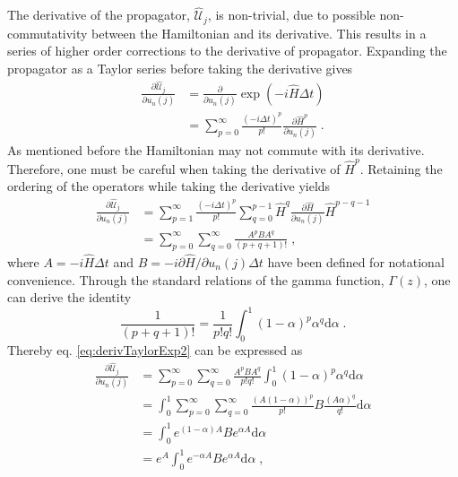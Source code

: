 The derivative of the propagator, $\hat{\mathcal{U}}_{j}$, is non-trivial, due to possible non-commutativity between the Hamiltonian and its derivative. This results in a series of higher order corrections to the derivative of propagator.
Expanding the propagator as a Taylor series before taking the derivative gives
\begin{align}
	\frac{\partial \hat{\mathcal{U}}_{j}}{\partial u_n (j)} &= \frac{\partial}{\partial u_n (j)}  \exp \left( -i \hat{H} \Delta t \right) \nonumber \\
	&= \sum_{p = 0}^{\infty} \frac{( -i \Delta t  )^p}{p!} \frac{\partial \hat{H}^p}{\partial u_n (j)} \; .  
	\label{eq:derivTaylorExp}
\end{align}
As mentioned before the Hamiltonian may not commute with its derivative. Therefore, one must be careful when taking the derivative of $\hat{H}^p$. Retaining the ordering of the operators while taking the derivative yields
\begin{align}
	\frac{\partial \hat{\mathcal{U}}_{j}}{\partial u_n (j)} &= \sum_{p=1}^{\infty} \frac{ \left( -i \Delta t \right) ^p }{p!} \sum_{q=0}^{p-1} \hat{H}^q \frac{\partial \hat{H}}{\partial u_n (j)} \hat{H}^{p-q-1} \nonumber \\
	&= \sum_{p=0}^{\infty} \sum_{q=0}^{\infty} \frac{A^p B A^q}{(p+q+1)!} \; , \label{eq:derivTaylorExp2}
\end{align} 
where $A = -i \hat{H} \Delta t$ and $B = -i \partial \hat{H}/\partial u_n (j) \Delta t$ have been defined for notational convenience. Through the standard relations of the gamma function, $\Gamma (z)$, one can derive the identity
\begin{equation}
	\frac{1}{(p+q+1)!} = \frac{1}{p! q !} \int_{0}^{1} (1-\alpha)^p \alpha^q \mathrm{d}\alpha \; .
\end{equation}
Thereby eq. \eqref{eq:derivTaylorExp2} can be expressed as
\begin{align}
	\frac{\partial \hat{\mathcal{U}}_{j}}{\partial u_n (j)} &= \sum_{p=0}^{\infty} \sum_{q=0}^{\infty} \frac{A^p B A^q}{p! q !}  \int_{0}^{1} (1-\alpha)^p \alpha^q \mathrm{d}\alpha \nonumber \\
	&= \int_{0}^{1} \sum_{p=0}^{\infty} \sum_{q=0}^{\infty} \frac{(A (1- \alpha))^p}{p!} B \frac{(A \alpha)^q}{q!}  \mathrm{d}\alpha \nonumber \\
	&= \int_{0}^{1} e^{ (1- \alpha) A} B e^{ \alpha A} \mathrm{d}\alpha \nonumber \\
	 &= e^A \int_{0}^{1} e^{ - \alpha A} B e^{ \alpha A} \mathrm{d}\alpha \; , \label{eq:eq:derivTaylorExp3}
\end{align}
